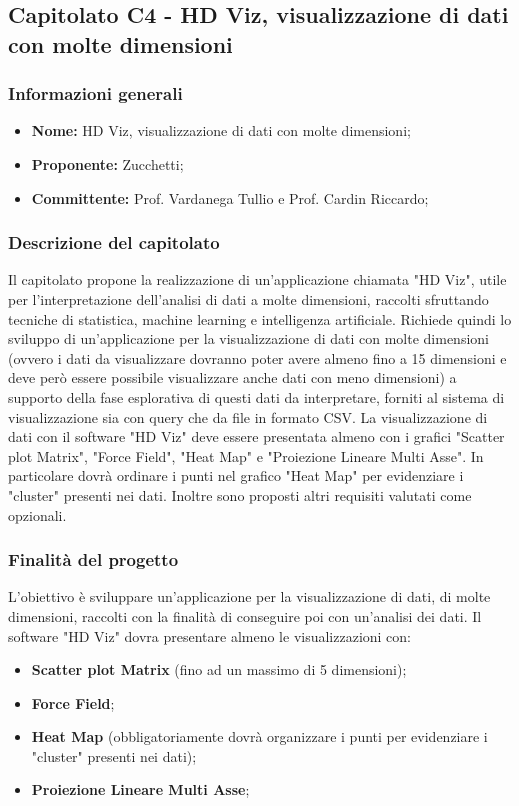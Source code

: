 \subsection{Capitolato C4 - HD Viz, visualizzazione di dati con molte dimensioni}
\subsubsection{Informazioni generali}
	\begin{itemize}
	\item \textbf{Nome:} HD Viz, visualizzazione di dati con molte dimensioni;
	\item \textbf{Proponente:} Zucchetti;
	\item \textbf{Committente:}  Prof. Vardanega Tullio e Prof. Cardin Riccardo;
	\end{itemize}
\subsubsection{Descrizione del capitolato}
Il capitolato propone la realizzazione di un'applicazione chiamata "HD Viz", utile per l'interpretazione dell'analisi di dati a molte dimensioni, raccolti sfruttando tecniche di statistica, machine learning e intelligenza artificiale.
Richiede quindi lo sviluppo di un'applicazione per la visualizzazione di dati con molte dimensioni (ovvero i dati da visualizzare dovranno poter avere almeno fino a 15 dimensioni e deve però essere possibile visualizzare anche dati con meno dimensioni) a supporto della fase esplorativa di questi dati da interpretare, forniti al sistema di visualizzazione sia con query che da file in formato CSV.
La visualizzazione di dati con il software "HD Viz" deve essere presentata almeno con i grafici "Scatter plot Matrix", "Force Field", "Heat Map" e "Proiezione Lineare Multi Asse". In particolare dovrà ordinare i punti nel grafico "Heat Map" per evidenziare i "cluster" presenti nei dati.
Inoltre sono proposti altri requisiti valutati come opzionali.
\subsubsection{Finalità del progetto}
L'obiettivo è sviluppare un'applicazione per la visualizzazione di dati, di molte dimensioni, raccolti con la finalità di conseguire poi con un'analisi dei dati.
Il software "HD Viz" dovra presentare almeno le visualizzazioni con:
\begin{itemize}
\item \textbf{Scatter plot Matrix} (fino ad un massimo di 5 dimensioni);
\item \textbf{Force Field};
\item \textbf{Heat Map} (obbligatoriamente dovrà organizzare i punti per evidenziare i "cluster" presenti nei dati);
\item \textbf{Proiezione Lineare Multi Asse};
\end{itemize}
